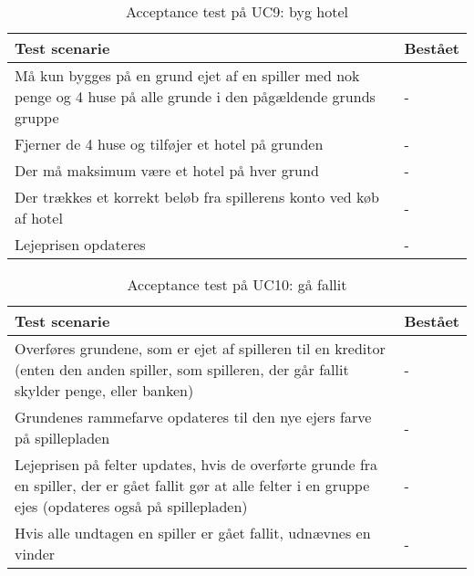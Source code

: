 \documentclass[class=article, crop=false]{standalone}
\begin{document}
    \begin{table}[H]
        \caption{Acceptance test på UC9: byg hotel}
        \begin{tabularx}{\textwidth}{|X|l|}
            \hline
            \textbf{Test scenarie}       & \textbf{Bestået}   \\ \hline
            Må kun bygges på en grund ejet af en spiller med nok penge og 4 huse på alle grunde i den pågældende grunds gruppe     & - \\ \hline
            Fjerner de 4 huse og tilføjer et hotel på grunden     & -\\ \hline
            Der må maksimum være et hotel på hver grund     & -\\ \hline
            Der trækkes et korrekt beløb fra spillerens konto ved køb af hotel     & -\\ \hline
            Lejeprisen opdateres     & - \\ \hline
        \end{tabularx}
    \end{table}

    \begin{table}[H]
        \caption{Acceptance test på UC10: gå fallit}
        \begin{tabularx}{\textwidth}{|X|l|}
            \hline
            \textbf{Test scenarie}       & \textbf{Bestået}   \\ \hline
            Overføres grundene, som er ejet af spilleren til en kreditor (enten den anden spiller, som spilleren, der går fallit skylder penge, eller banken) & - \\ \hline
            Grundenes rammefarve opdateres til den nye ejers farve på spillepladen & -\\ \hline
            Lejeprisen på felter updates, hvis de overførte grunde fra en spiller, der er gået fallit gør at alle felter i en gruppe ejes (opdateres også på spillepladen) & -\\ \hline
            Hvis alle undtagen en spiller er gået fallit, udnævnes en vinder& -\\ \hline
        \end{tabularx}
    \end{table}
\end{document}
